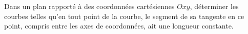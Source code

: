 \begin{exercice}\label{exo_II-1-27}

Dans un plan rapporté à des coordonnées cartésiennes $Oxy$, déterminer les courbes telles qu'en tout point de la courbe, le segment de sa tangente en ce point, compris entre les axes de coordonnées, ait une longueur constante.

\end{exercice}


